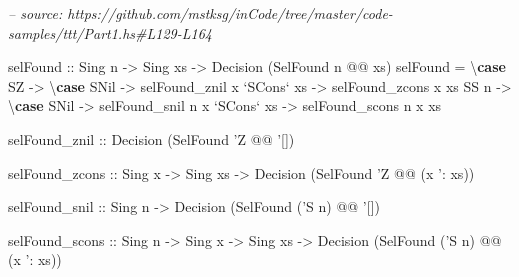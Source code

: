 \documentclass[]{article}
\newenvironment{Shaded}{}{}
\newcommand{\CommentTok}[1]{\textcolor[rgb]{0.38,0.63,0.69}{\textit{#1}}}
\newcommand{\DataTypeTok}[1]{\textcolor[rgb]{0.56,0.13,0.00}{#1}}
\newcommand{\FunctionTok}[1]{\textcolor[rgb]{0.02,0.16,0.49}{#1}}
\newcommand{\KeywordTok}[1]{\textcolor[rgb]{0.00,0.44,0.13}{\textbf{#1}}}
\newcommand{\NormalTok}[1]{#1}
\newcommand{\OtherTok}[1]{\textcolor[rgb]{0.00,0.44,0.13}{#1}}
\begin{document}
\begin{Shaded}
\begin{Highlighting}[]
\CommentTok{-- source: https://github.com/mstksg/inCode/tree/master/code-samples/ttt/Part1.hs#L129-L164}

\NormalTok{selFound}
\OtherTok{    ::} \DataTypeTok{Sing}\NormalTok{ n}
    \OtherTok{->} \DataTypeTok{Sing}\NormalTok{ xs}
    \OtherTok{->} \DataTypeTok{Decision}\NormalTok{ (}\DataTypeTok{SelFound}\NormalTok{ n }\FunctionTok{@@}\NormalTok{ xs)}
\NormalTok{selFound }\FunctionTok{=}\NormalTok{ \textbackslash{}}\KeywordTok{case}
    \DataTypeTok{SZ} \OtherTok{->}\NormalTok{ \textbackslash{}}\KeywordTok{case}
      \DataTypeTok{SNil}         \OtherTok{->}\NormalTok{ selFound_znil}
\NormalTok{      x }\OtherTok{`SCons`}\NormalTok{ xs }\OtherTok{->}\NormalTok{ selFound_zcons x xs}
    \DataTypeTok{SS}\NormalTok{ n }\OtherTok{->}\NormalTok{ \textbackslash{}}\KeywordTok{case}
      \DataTypeTok{SNil}         \OtherTok{->}\NormalTok{ selFound_snil n}
\NormalTok{      x }\OtherTok{`SCons`}\NormalTok{ xs }\OtherTok{->}\NormalTok{ selFound_scons n x xs}

\NormalTok{selFound_znil}
\OtherTok{    ::} \DataTypeTok{Decision}\NormalTok{ (}\DataTypeTok{SelFound}\NormalTok{ '}\DataTypeTok{Z} \FunctionTok{@@}\NormalTok{ '[])}

\NormalTok{selFound_zcons}
\OtherTok{    ::} \DataTypeTok{Sing}\NormalTok{ x}
    \OtherTok{->} \DataTypeTok{Sing}\NormalTok{ xs}
    \OtherTok{->} \DataTypeTok{Decision}\NormalTok{ (}\DataTypeTok{SelFound}\NormalTok{ '}\DataTypeTok{Z} \FunctionTok{@@}\NormalTok{ (x '}\FunctionTok{:}\NormalTok{ xs))}

\NormalTok{selFound_snil}
\OtherTok{    ::} \DataTypeTok{Sing}\NormalTok{ n}
    \OtherTok{->} \DataTypeTok{Decision}\NormalTok{ (}\DataTypeTok{SelFound}\NormalTok{ ('}\DataTypeTok{S}\NormalTok{ n) }\FunctionTok{@@}\NormalTok{ '[])}

\NormalTok{selFound_scons}
\OtherTok{    ::} \DataTypeTok{Sing}\NormalTok{ n}
    \OtherTok{->} \DataTypeTok{Sing}\NormalTok{ x}
    \OtherTok{->} \DataTypeTok{Sing}\NormalTok{ xs}
    \OtherTok{->} \DataTypeTok{Decision}\NormalTok{ (}\DataTypeTok{SelFound}\NormalTok{ ('}\DataTypeTok{S}\NormalTok{ n) }\FunctionTok{@@}\NormalTok{ (x '}\FunctionTok{:}\NormalTok{ xs))}
\end{Highlighting}
\end{Shaded}
\end{document}
